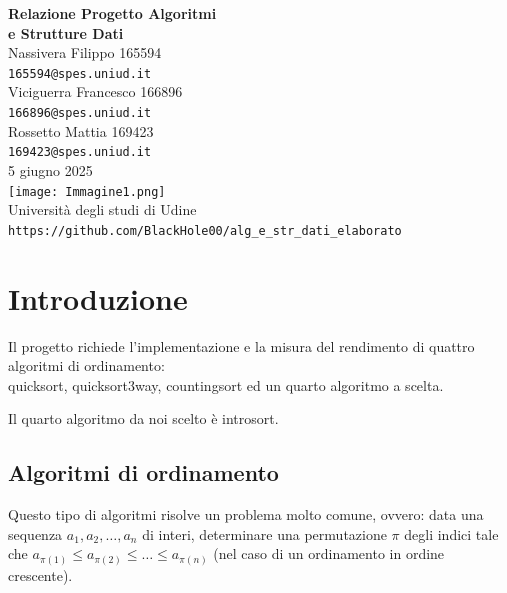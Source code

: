 \documentclass{article}
\begin{document}
\vspace*{3cm}

\begin{center}
    \LARGE \textbf{Relazione Progetto Algoritmi\\ e Strutture Dati} \\[1.5cm]
    
    \large
    Nassivera Filippo 165594 \\
    \texttt{165594@spes.uniud.it} \\[0.5cm]
    
    Viciguerra Francesco 166896 \\
    \texttt{166896@spes.uniud.it} \\[0.5cm]
    
    Rossetto Mattia 169423 \\
    \texttt{169423@spes.uniud.it} \\[0.5cm]
    
    \vspace{1cm}
    5 giugno 2025 \\[2cm]
    
    \texttt{[image: Immagine1.png]} \\
    \vspace{0.5cm}
    \textbf{}Università degli studi di Udine\\[0.5cm]
    \nolinkurl{https://github.com/BlackHole00/alg_e_str_dati_elaborato}
\end{center}

\thispagestyle{empty}  %
\newpage

\setcounter{page}{1} 
\tableofcontents

\newpage

\section{Introduzione}
    Il progetto richiede l’implementazione e la misura del rendimento di quattro algoritmi di ordinamento: \\
    quicksort, quicksort3way, countingsort ed un quarto algoritmo a scelta.
    
    Il quarto algoritmo da noi scelto è introsort.
    
    \subsection{Algoritmi di ordinamento}
        Questo tipo di algoritmi risolve un problema molto comune, ovvero:
        data una sequenza $a_1, a_2,\dots, a_n$ di interi, determinare una permutazione $\pi$ degli indici tale che $a_{\pi(1)} \le a_{\pi(2)} \le \dots \le a_{\pi(n)}$ (nel caso di un ordinamento in ordine crescente).
\end{document}
